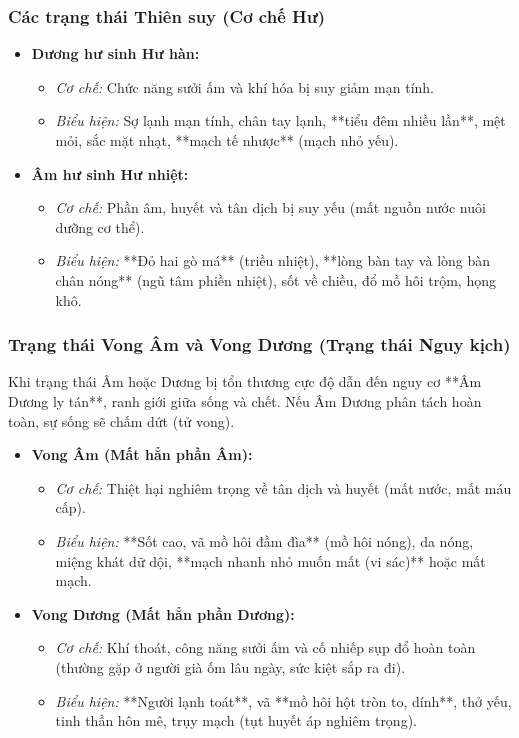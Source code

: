 \subsubsection{Các trạng thái Thiên suy (Cơ chế Hư)}
\begin{itemize}
    \item \textbf{Dương hư sinh Hư hàn:} 
    \begin{itemize}
        \item \textit{Cơ chế:} Chức năng sưởi ấm và khí hóa bị suy giảm mạn tính.
        \item \textit{Biểu hiện:} Sợ lạnh mạn tính, chân tay lạnh, **tiểu đêm nhiều lần**, mệt mỏi, sắc mặt nhạt, **mạch tế nhược** (mạch nhỏ yếu).
    \end{itemize}

    \item \textbf{Âm hư sinh Hư nhiệt:} 
    \begin{itemize}
        \item \textit{Cơ chế:} Phần âm, huyết và tân dịch bị suy yếu (mất nguồn nước nuôi dưỡng cơ thể).
        \item \textit{Biểu hiện:} **Đỏ hai gò má** (triều nhiệt), **lòng bàn tay và lòng bàn chân nóng** (ngũ tâm phiền nhiệt), sốt về chiều, đổ mồ hôi trộm, họng khô.
    \end{itemize}
\end{itemize}

\subsubsection{Trạng thái Vong Âm và Vong Dương (Trạng thái Nguy kịch)}
Khi trạng thái Âm hoặc Dương bị tổn thương cực độ dẫn đến nguy cơ **Âm Dương ly tán**, ranh giới giữa sống và chết. Nếu Âm Dương phân tách hoàn toàn, sự sống sẽ chấm dứt (tử vong).

\begin{itemize}
    \item \textbf{Vong Âm (Mất hẳn phần Âm):}
    \begin{itemize}
        \item \textit{Cơ chế:} Thiệt hại nghiêm trọng về tân dịch và huyết (mất nước, mất máu cấp).
        \item \textit{Biểu hiện:} **Sốt cao, vã mồ hôi đầm đìa** (mồ hôi nóng), da nóng, miệng khát dữ dội, **mạch nhanh nhỏ muốn mất (vi sác)** hoặc mất mạch.
    \end{itemize}

    \item \textbf{Vong Dương (Mất hẳn phần Dương):}
    \begin{itemize}
        \item \textit{Cơ chế:} Khí thoát, công năng sưởi ấm và cố nhiếp sụp đổ hoàn toàn (thường gặp ở người già ốm lâu ngày, sức kiệt sắp ra đi).
        \item \textit{Biểu hiện:} **Người lạnh toát**, vã **mồ hôi hột tròn to, dính**, thở yếu, tinh thần hôn mê, trụy mạch (tụt huyết áp nghiêm trọng).
    \end{itemize}
\end{itemize}

